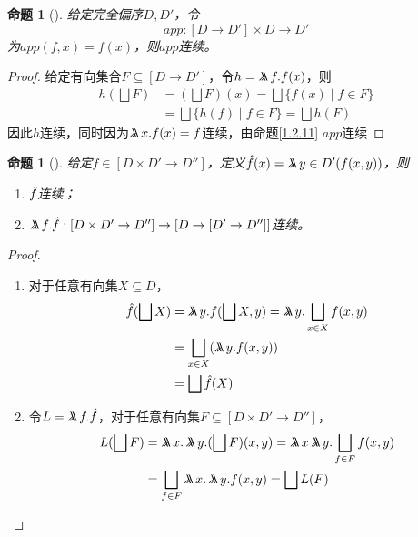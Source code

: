 \documentclass[11pt]{article}
\newtheorem{proposition}[theorem]{命题}
\begin{document}
\begin{proposition}[]
\label{1.2.13}
给定完全偏序\(D,D'\)，令
\begin{equation*}
app:[D\to D']\times D\to D'
\end{equation*}
为\(app(f,x)=f(x)\)，则\(app\)连续。
\end{proposition}

\begin{proof}
给定有向集合\(F\subseteq[D\to D']\)，令\(h=\metalambda f.f(x)\)，则
\begin{align*}
h(\bigsqcup F)&=(\bigsqcup F)(x)=\bigsqcup\{f(x)\mid f\in F\}\\
&=\bigsqcup\{h(f)\mid f\in F\}=\bigsqcup h(F)
\end{align*}
因此\(h\)连续，同时因为\(\metalambda x.f(x)=f\)连续，由命题\ref{1.2.11} \(app\)连续
\end{proof}

\begin{proposition}[]
\label{1.2.14}
给定\(f\in[D\times D'\to D'']\)，定义\(\hatf(x)=\metalambda y\in D'(f(x,y))\)，则
\begin{enumerate}
\item \(\hat{f}\)连续；
\item \(\metalambda f.\hatf:[D\times D'\to D'']\to[D\to[D'\to D'']]\)连续。
\end{enumerate}
\end{proposition}

\begin{proof}
\begin{enumerate}
\item 对于任意有向集\(X\subseteq D\)，
\begin{align*}
\hatf(\bigsqcup X)&=\metalambda y.f(\bigsqcup X,y)=\metalambda y.\bigsqcup_{x\in X}f(x,y)\\
&=\bigsqcup_{x\in X}(\metalambda y.f(x,y))\\
&=\bigsqcup\hatf(X)
\end{align*}
\item 令\(L=\metalambda f.\hatf\)，对于任意有向集\(F\subseteq[D\times D'\to D'']\)，
\begin{align*}
L(\bigsqcup F)&=\metalambda x.\metalambda y.(\bigsqcup F)(x,y)=\metalambda x\metalambda y.\bigsqcup_{f\in F}f(x,y)\\
&=\bigsqcup_{f\in F}\metalambda x.\metalambda y.f(x,y)=\bigsqcup L(F)
\end{align*}
\end{enumerate}
\end{proof}
\end{document}

